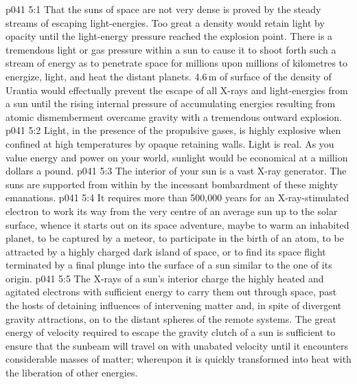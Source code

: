 \vs p041 5:1 That the suns of space are not very dense is proved by the steady streams of escaping light\hyp{}energies. Too great a density would retain light by opacity until the light\hyp{}energy pressure reached the explosion point. There is a tremendous light or gas pressure within a sun to cause it to shoot forth such a stream of energy as to penetrate space for millions upon millions of kilometres to energize, light, and heat the distant planets. 4.6\,m of surface of the density of Urantia would effectually prevent the escape of all X\hyp{}rays and light\hyp{}energies from a sun until the rising internal pressure of accumulating energies resulting from atomic dismemberment overcame gravity with a tremendous outward explosion.
\vs p041 5:2 Light, in the presence of the propulsive gases, is highly explosive when confined at high temperatures by opaque retaining walls. Light is real. As you value energy and power on your world, sunlight would be economical at a million dollars a pound.
\vs p041 5:3 The interior of your sun is a vast X\hyp{}ray generator. The suns are supported from within by the incessant bombardment of these mighty emanations.
\vs p041 5:4 It requires more than 500,000 years for an X\hyp{}ray\hyp{}stimulated electron to work its way from the very centre of an average sun up to the solar surface, whence it starts out on its space adventure, maybe to warm an inhabited planet, to be captured by a meteor, to participate in the birth of an atom, to be attracted by a highly charged dark island of space, or to find its space flight terminated by a final plunge into the surface of a sun similar to the one of its origin.
\vs p041 5:5 The X\hyp{}rays of a sun’s interior charge the highly heated and agitated electrons with sufficient energy to carry them out through space, past the hosts of detaining influences of intervening matter and, in spite of divergent gravity attractions, on to the distant spheres of the remote systems. The great energy of velocity required to escape the gravity clutch of a sun is sufficient to ensure that the sunbeam will travel on with unabated velocity until it encounters considerable masses of matter; whereupon it is quickly transformed into heat with the liberation of other energies.
